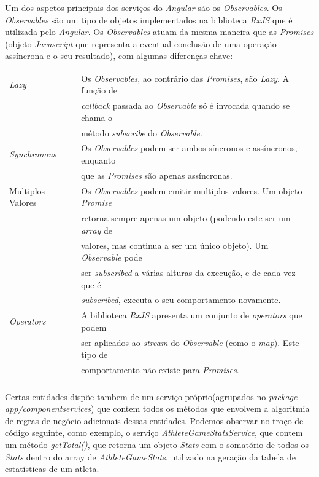 Um dos aspetos principais dos serviços do \textit{Angular} são os \textit{Observables}. Os \textit{Observables} são um tipo de objetos implementados na biblioteca \textit{RxJS} que é utilizada pelo \textit{Angular}. Os \textit{Observables} atuam da mesma maneira que as \textit{Promises} (objeto \textit{Javascript} que representa a eventual conclusão de uma operação assíncrona e o seu resultado), com algumas diferenças chave: \\

\begin{tabular}{ll}
	\textit{Lazy} & Os \textit{Observables}, ao contrário das \textit{Promises}, são \textit{Lazy}. A função de\\
	& \textit{callback} passada ao \textit{Observable} só é invocada quando se chama o \\
	&método \textit{subscribe} do \textit{Observable}. \\
	\textit{Synchronous} & Os \textit{Observables} podem ser ambos síncronos e assíncronos, enquanto\\
	& que as \textit{Promises} são apenas assíncronas. \\
	Multiplos Valores & Os \textit{Observables} podem emitir multiplos valores. Um objeto \textit{Promise}\\
	& retorna sempre apenas um objeto (podendo este ser um \textit{array} de \\
	&valores, mas continua a ser um único objeto). Um \textit{Observable} pode \\
	&ser \textit{subscribed} a várias alturas da execução, e de cada vez que é \\
	&\textit{subscribed}, executa o seu comportamento novamente.\\
	\textit{Operators} & A biblioteca \textit{RxJS} apresenta um conjunto de \textit{operators} que podem \\
	&ser aplicados ao \textit{stream} do \textit{Observable} (como o \textit{map}). Este tipo de\\
	&comportamento não existe para \textit{Promises}.\\
	
	\\
\end{tabular}


Certas entidades dispõe tambem de um serviço próprio(agrupados no \textit{package} \textit{app/componentservices}) que contem todos os métodos que envolvem a algoritmia de regras de negócio adicionais dessas entidades. 
Podemos observar no troço de código seguinte, como exemplo, o serviço \textit{AthleteGameStatsService}, que contem um método \textit{getTotal()}, que retorna um objeto \textit{Stats} com o somatório de todos os \textit{Stats} dentro do array de \textit{AthleteGameStats}, utilizado na geração da tabela de estatísticas de um atleta. 

